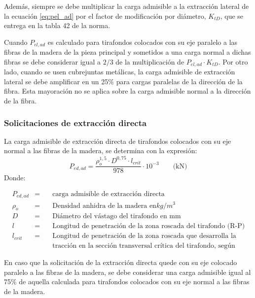 Además, siempre se debe multiplicar la carga admisible a la extracción lateral de la ecuación \ref{eq:pel_ad} por el factor de modificación por diámetro, $K_{tD}$, que se entrega en la tabla 42 de la norma.

Cuando $P_{el,ad}$ es calculado para tirafondos colocados con su eje paralelo a las fibras de la madera de la pieza principal y sometidos a una carga normal a dichas fibras se debe considerar igual a $2/3$ de la multiplicación de $P_{el,ad} \cdot K_{tD}$. Por otro lado, cuando se usen cubrejuntas metálicas, la carga admisible de extracción lateral se debe amplificar en un 25\% para cargas paralelas de la dirección de la fibra. Esta mayoración no se aplica sobre la carga admisible normal a la dirección de la fibra.

\subsubsection{Solicitaciones de extracción directa}
La carga admisible de extracción directa de tirafondos colocados con su eje normal a las fibras de la madera, se determina con la expresión:
\begin{equation}\label{eq:ped_ad}
	P_{ed,ad} = \frac{\rho_{o}^{1,5} \cdot D^{0,75} \cdot l_{crit}}{978} \cdot 10^{-3} \qquad \text{(kN)}
\end{equation}
Donde:

\begin{align*}
&P_{ed,ad} &= \quad &\text{carga admisible de extracción directa}\\
&\rho_o &= \quad &\text{Densidad anhidra de la madera en} kg/m^3 \\
&D &= \quad &\text{Diámetro del vástago del tirafondo en mm}\\
&l &= \quad &\text{Longitud de penetración de la zona roscada del tirafondo (R-P) en la madera, en mm}\\
&l_{crit} &= \quad &\text{Longitud de penetración de la zona roscada que desarrolla la capacidad admisible de}\\
& & & \text{tracción  en la sección transversal crítica del tirafondo, según tabla 43 de la norma.}
\end{align*}

En caso que la solicitación de la extracción directa quede con su eje colocado paralelo a las fibras de la madera, se debe considerar una carga admisible igual al 75\% de aquella calculada para tirafondos colocados con su eje normal a las fibras de la madera.

